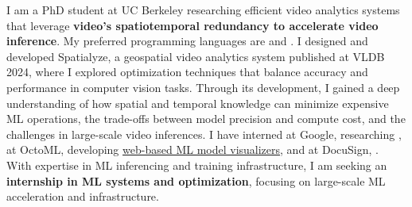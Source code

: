 \cvsummarysection


\begin{cvparagraph}

I am a PhD student at UC Berkeley researching efficient video analytics systems that leverage {\bf video's spatiotemporal redundancy to accelerate video inference}.
My preferred programming languages are \underline{} and \underline{}.
I designed and developed Spatialyze, a geospatial video analytics system published at VLDB 2024, where I explored optimization techniques that balance accuracy and performance in computer vision tasks.
Through its development, I gained a deep understanding of how spatial and temporal knowledge can minimize expensive ML operations, the trade-offs between model precision and compute cost, and the challenges in large-scale video inferences.
I have interned
at Google, researching \underline{},
at OctoML, developing \underline{web-based ML model visualizers},
and at DocuSign, \underline{}.
With expertise in ML inferencing and training infrastructure, I am seeking an {\bf internship in ML systems and optimization}, focusing on large-scale ML acceleration and infrastructure.
\end{cvparagraph}
\vspace{-1mm}
